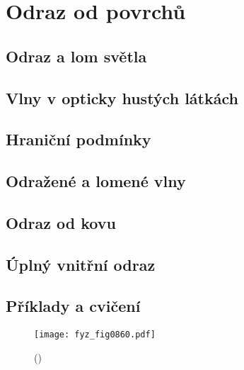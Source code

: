 \setchaptertoc
\chapter{Odraz od povrchů}\label{fyz:IIchapXXXIII}

  \section{Odraz a lom světla}\label{fyz:IIchapXXXIIIsecI}
  \section{Vlny v opticky hustých látkách}\label{fyz:IIchapXXXIIIsecII}
  \section{Hraniční podmínky}\label{fyz:IIchapXXXIIIsecIII}
  \section{Odražené a lomené vlny}\label{fyz:IIchapXXXIIIsecIV}
  \section{Odraz od kovu}\label{fyz:IIchapXXXIIIsecV}
  \section{Úplný vnitřní odraz}\label{fyz:IIchapXXXIIIsecVI}
  \section{Příklady a cvičení}\label{fyz:IIchapXXXIIIsecVII}

    \begin{figure}[ht!] %
      \centering
      \texttt{[image: fyz\_fig0860.pdf]}
      \caption{
               (\cite[s.~707]{Feynman02})}
      \label{fyz:fig0860}
    \end{figure}

